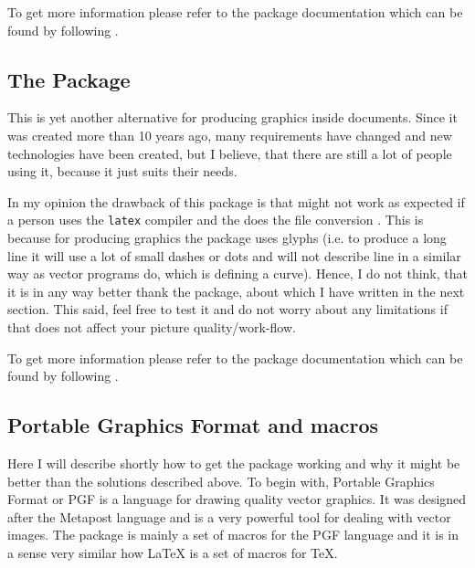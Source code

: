 \documentclass[
]{scrartcl}
\begin{document}
%
To get more information please refer to the package documentation which can be
    found by following
    .

%
\subsection{The  Package}

%
This is yet another alternative for producing graphics inside 
    documents.
%
Since it was created more than 10 years ago, many requirements have changed and
    new technologies have been created, but I believe, that there are still a
    lot of people using it, because it just suits their needs.

%
In my opinion the drawback of this package is that might not work as expected if
    a person uses the \texttt{latex} compiler and the does the file conversion
     \textrightarrow {} \textrightarrow {}.
%
This is because for producing graphics the package uses glyphs (i.e. to produce
    a long line it will use a lot of small dashes or dots and will not describe
    line in a similar way as vector programs do, which is defining a curve).
%
Hence, I do not think, that it is in any way better thank the 
    package, about which I have written in the next section.
%
This said, feel free to test it and do not worry about any limitations if that
    does not affect your picture quality/work-flow.

%
To get more information please refer to the package documentation which can be
    found by following
    .

%
\subsection{Portable Graphics Format and  macros}

%
Here I will describe shortly how to get the  package working and why
    it might be better than the solutions described above.
%
To begin with, Portable Graphics Format or PGF is a language for drawing quality
    vector graphics.
%
It was designed after the Metapost language and is a very powerful tool for
    dealing with vector images.
%
The  package is mainly a set of macros for the PGF language and it is
    in a sense very similar how \LaTeX{} is a set of macros for \TeX{}.
\end{document}
